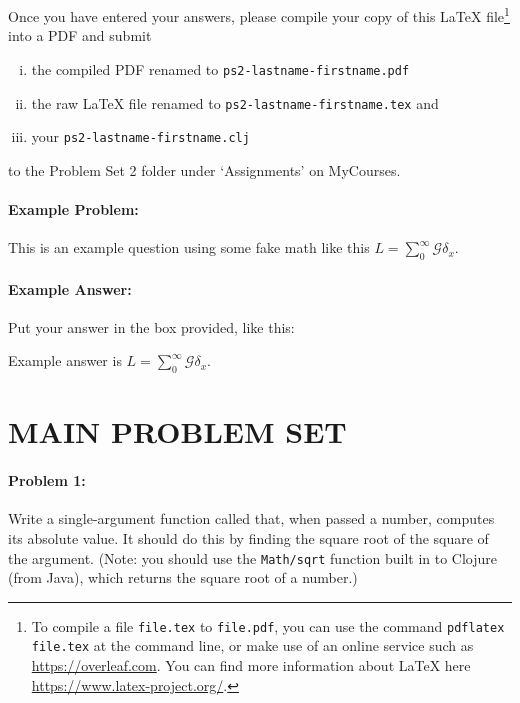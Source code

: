 \documentclass[10pt]{article}
\newenvironment{AnswerBox}{\begin{mdframed}[style=simple]}{\end{mdframed}}
\newcommand{\required}[1]{{\color{blue}{#1}}}
\newcommand{\PSnum}{2}
\begin{document}
Once you have entered your answers, please compile your copy of this \LaTeX{}
file\footnote{To compile a file \texttt{file.tex} to \texttt{file.pdf}, you can
  use the command \texttt{pdflatex file.tex} at the command line, or make use of
  an online service such as \url{https://overleaf.com}. You can find more
information about \LaTeX{} here \url{https://www.latex-project.org/}.} into a
PDF and submit
\begin{enumerate}[(i),noitemsep]
  \item the compiled PDF renamed to \texttt{ps\PSnum-lastname-firstname.pdf}
  \item the raw \LaTeX{} file renamed to
    \texttt{ps\PSnum-lastname-firstname.tex} and
  \item your \texttt{ps\PSnum-lastname-firstname.clj}
\end{enumerate}
to the Problem Set \PSnum{} folder under `Assignments' on MyCourses.

\noindent\hrulefill %

\paragraph{Example Problem:} This is an example question using some fake math
like this $L=\sum_0^{\infty} \mathcal{G} \delta_x$.

\paragraph{Example Answer:} Put your answer in the box provided, like this:
\begin{AnswerBox}
  Example answer is $L=\sum_0^{\infty} \mathcal{G} \delta_x$.
\end{AnswerBox}


\pagebreak%
\section*{MAIN PROBLEM SET}
\paragraph{Problem 1:}
Write a single-argument function called \required{\texttt{absval}} that, when
passed a number,  computes its absolute value.  It should do this by finding the
square root of the square of the argument.  (Note: you should use the
\texttt{Math/sqrt} function built in to Clojure (from Java), which returns the
square root of a number.)
\end{document}
